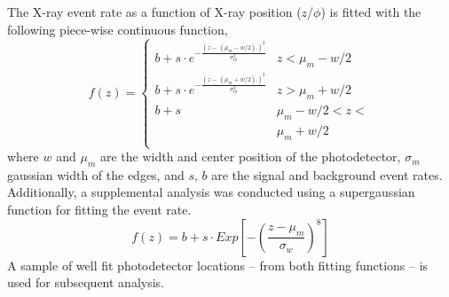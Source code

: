 The X-ray event rate as a function of X-ray position ($z$/$\phi$) is
fitted with the following piece-wise continuous function,
\begin{equation} \label{eqn:linetwogaus}
    f(z) = 
    \begin{cases}
        b+s\cdot e^{-\frac{(z - \, (\mu_m - w/2)\, )^2}{\sigma_m^2}} & z < \mu_m-w/2     \\
        b+s\cdot e^{-\frac{(z - \, (\mu_m + w/2)\, )^2}{\sigma_m^2}} & z > \mu_m+w/2     \\
        b+s                                         & \mu_m - w/2 < z < \\
                                               & \mu_m + w/2    \\
    \end{cases}
\end{equation}
where $w$ and $\mu_{m}$ are the width and center position of
the photodetector, $\sigma_{m}$ gaussian width of the edges, and $s,\,b$
are the signal and background event rates. Additionally, a supplemental 
analysis was conducted using a supergaussian function for fitting the
event rate.\\
\begin{equation} \label{eqn:supergaus}
    f(z)=b+s\cdot Exp\left[-\left(\frac{z-\mu_{m}}{\sigma_{w}}\right)^{8}\right]
\end{equation}
A sample of well fit photodetector locations -- from both fitting functions -- is used for  subsequent analysis.




